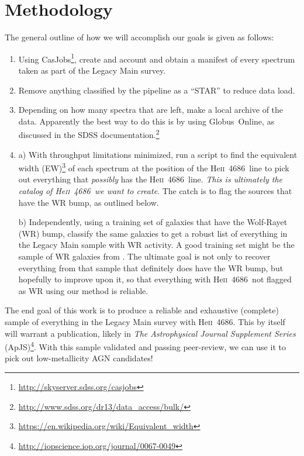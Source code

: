 \documentclass[iop,apj]{emulateapj}
\def\heii{He\hspace{1mm}\textsc{ii}~4686}
\begin{document}
\section{Methodology}

The general outline of how we will accomplish our goals is given as follows:

\begin{enumerate}

\item{Using CasJobs\footnote{\url{http://skyserver.sdss.org/casjobs}}, create and account and obtain a manifest of every spectrum taken as part of the Legacy Main survey.}

\item{Remove anything classified by the pipeline as a ``STAR'' to reduce data load.}

\item{Depending on how many spectra that are left, make a local archive of the data. Apparently the best way to do this is by using Globus~Online, as discussed in the SDSS documentation.\footnote{\url{http://www.sdss.org/dr13/data_access/bulk/}}}

\item{ 

a) With throughput limitations minimized, run a script to find the equivalent width (EW)\footnote{\url{https://en.wikipedia.org/wiki/Equivalent_width}} of each spectrum at the position of the \heii\ line to pick out everything that \textit{possibly} has the \heii\ line. \textit{This is ultimately the catalog of \heii\ we want to create}. The catch is to flag the sources that have the WR bump, as outlined below.

b) Independently, using a training set of galaxies that have the Wolf-Rayet (WR) bump, classify the same galaxies to get a robust list of everything in the Legacy Main sample with WR activity. A good training set might be the sample of WR galaxies from \citet{Brinchmann+08}. The ultimate goal is not only to recover everything from that sample that definitely does have the WR bump, but hopefully to improve upon it, so that everything with \heii\ not flagged as WR using our method is reliable.
}



\end{enumerate}

The end goal of this work is to produce a reliable and exhaustive (complete) sample of everything in the Legacy Main survey with \heii. This by itself will warrant a publication, likely in \textit{The Astrophysical Journal Supplement Series} (ApJS)\footnote{\url{http://iopscience.iop.org/journal/0067-0049}}. With this sample validated and passing peer-review, we can use it to pick out low-metallicity AGN candidates!
\end{document}

